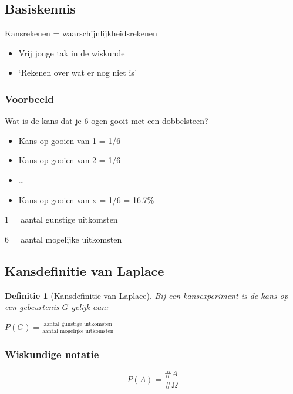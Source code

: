 \documentclass{article}
\newtheorem{theorem}{Definitie}[section]
\begin{document}
\subsection{Basiskennis}

Kansrekenen = waarschijnlijkheidsrekenen

\begin{itemize}
    \item Vrij jonge tak in de wiskunde
    \item `Rekenen over wat er nog niet is'
\end{itemize}

\subsubsection{Voorbeeld}

Wat is de kans dat je 6 ogen gooit met een dobbelsteen?

\begin{itemize}
    \item Kans op gooien van 1 = 1/6
    \item Kans op gooien van 2 = 1/6
    \item \dots
    \item Kans op gooien van x = 1/6 = 16.7\%
\end{itemize}

1 = aantal gunstige uitkomsten

6 = aantal mogelijke uitkomsten

\subsection{Kansdefinitie van Laplace}

\begin{theorem}[Kansdefinitie van Laplace]
Bij een kansexperiment is de kans op een gebeurtenis $G$ gelijk aan:

$P(G) = \frac{\text{aantal gunstige uitkomsten}}{\text{aantal mogelijke uitkomsten}}$



\end{theorem}

\subsubsection{Wiskundige notatie}

\begin{equation}
    P(A) = \frac{\#A}{\#\Omega}
\end{equation}
    
\end{document}
